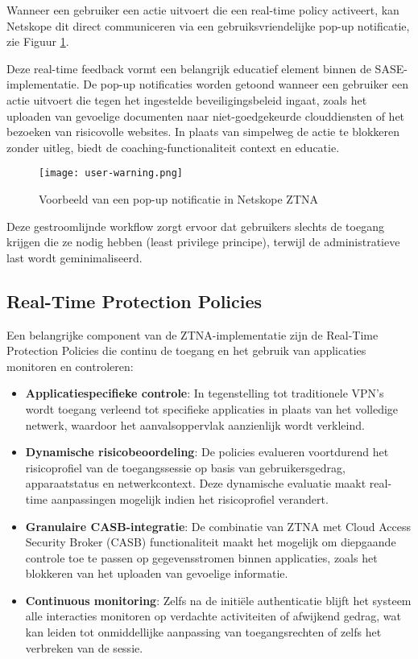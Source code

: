 Wanneer een gebruiker een actie uitvoert die een real-time policy activeert, kan Netskope dit direct communiceren via een gebruiksvriendelijke pop-up notificatie, zie Figuur \ref{fig:user-alert}. 

\vspace{2ex}

Deze real-time feedback vormt een belangrijk educatief element binnen de SASE-implementatie.
De pop-up notificaties worden getoond wanneer een gebruiker een actie uitvoert die tegen het ingestelde beveiligingsbeleid ingaat, zoals het uploaden van gevoelige documenten naar niet-goedgekeurde clouddiensten of het bezoeken van risicovolle websites. In plaats van simpelweg de actie te blokkeren zonder uitleg, biedt de coaching-functionaliteit context en educatie.
\begin{figure}[H]
    \centering
    \texttt{[image: user-warning.png]}
    \caption[Netskope ZTNA pop-up notificatie]{Voorbeeld van een pop-up notificatie in Netskope ZTNA}
    \label{fig:user-alert}
\end{figure}

Deze gestroomlijnde workflow zorgt ervoor dat gebruikers slechts de toegang krijgen die ze nodig hebben (least privilege principe), terwijl de administratieve last wordt geminimaliseerd.

\subsection{Real-Time Protection Policies}

Een belangrijke component van de ZTNA-implementatie zijn de Real-Time Protection Policies die continu de toegang en het gebruik van applicaties monitoren en controleren:

\begin{itemize}
    \item \textbf{Applicatiespecifieke controle}: In tegenstelling tot traditionele VPN's wordt toegang verleend tot specifieke applicaties in plaats van het volledige netwerk, waardoor het aanvalsoppervlak aanzienlijk wordt verkleind.

    \item \textbf{Dynamische risicobeoordeling}: De policies evalueren voortdurend het risicoprofiel van de toegangssessie op basis van gebruikersgedrag, apparaatstatus en netwerkcontext. Deze dynamische evaluatie maakt real-time aanpassingen mogelijk indien het risicoprofiel verandert.

    \item \textbf{Granulaire CASB-integratie}: De combinatie van ZTNA met Cloud Access Security Broker (CASB) functionaliteit maakt het mogelijk om diepgaande controle toe te passen op gegevensstromen binnen applicaties, zoals het blokkeren van het uploaden van gevoelige informatie.

    \item \textbf{Continuous monitoring}: Zelfs na de initiële authenticatie blijft het systeem alle interacties monitoren op verdachte activiteiten of afwijkend gedrag, wat kan leiden tot onmiddellijke aanpassing van toegangsrechten of zelfs het verbreken van de sessie.
\end{itemize}

